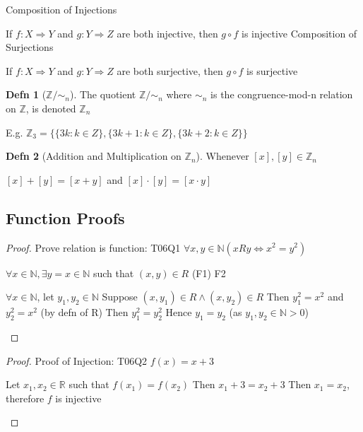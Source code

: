 \documentclass[a4paper]{article}
\theoremstyle{definition}
\newtheorem*{defn}{Defn}
\newenvironment{theorem}[1]
  {\renewcommand\theinnertheorem{#1}\innertheorem}
  {\endinnertheorem}
\begin{document}
\begin{theorem}{7.3.3} Composition of Injections

  If $f: X \Rightarrow Y$ and $g: Y \Rightarrow Z$ are both injective, then $g \circ f$ is injective
\end{theorem}
\begin{theorem}{7.3.4} Composition of Surjections

  If $f: X \Rightarrow Y$ and $g: Y \Rightarrow Z$ are both surjective, then $g \circ f$ is surjective
\end{theorem}

\begin{defn}[$\mathbb{Z}/ \sim_n$] The quotient $\mathbb{Z}/\sim_n$ where $\sim_n$ is the congruence-mod-n relation on $\mathbb{Z}$, is denoted $\mathbb{Z}_n$

  E.g. $\mathbb{Z}_3 = \{\{3k:k \in Z\}, \{3k + 1: k \in Z\}, \{3k + 2: k \in Z\}\}$
\end{defn}

\begin{defn}[Addition and Multiplication on $\mathbb{Z}_n$] Whenever $[x], [y] \in \mathbb{Z}_n$ 

  $[x] + [y] = [x + y]$ and $[x] \cdot [y] = [x \cdot y]$
\end{defn}

\subsection*{Function Proofs}

\begin{proof} Prove relation is function: T06Q1 $\forall x, y \in \mathbb{N} (xRy \iff x^2 = y^2)$
  \begin{numpf*}
    \pfln $\forall x \in \mathbb{N}, \exists y = x \in \mathbb{N}$ such that $(x,y) \in R$ (F1)
    \pfln F2
    \begin{subpf}
      \pfln $\forall x \in \mathbb{N}$, let $y_1, y_2 \in \mathbb{N}$
      \pfln Suppose $(x,y_1) \in R \land (x, y_2) \in R$
      \pfln Then $y_1^2 = x^2$ and $y_2^2 = x^2$ (by defn of R)
      \pfln Then $y_1^2 = y_2^2$
      \pfln Hence $y_1 = y_2$ (as $y_1,y_2 \in \mathbb{N} > 0$)
    \end{subpf}
  \end{numpf*}
\end{proof}

\begin{proof} Proof of Injection: T06Q2 $f(x) = x+3$
  \begin{numpf*}
    \pfln Let $x_1, x_2 \in \mathbb{R}$ such that $f(x_1) = f(x_2)$
    \pfln Then $x_1 + 3 = x_2 + 3$
    \pfln Then $x_1 = x_2$, therefore $f$ is injective
  \end{numpf*}
\end{proof}
\end{document}
